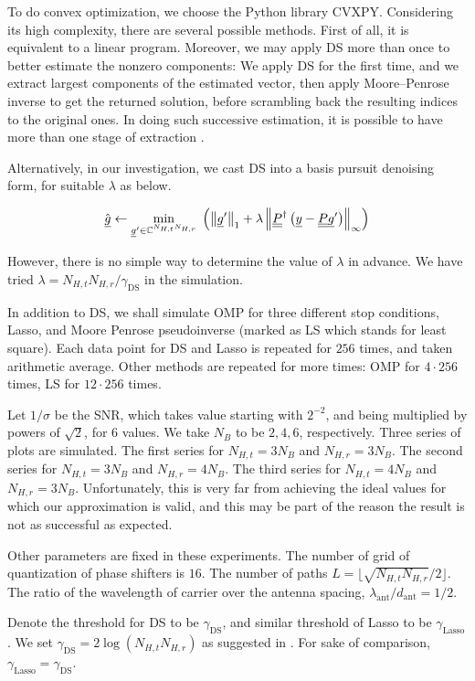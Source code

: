 \documentclass[journal]{IEEEtran}
\newcommand {\g} {\gamma}
\renewcommand {\l} {\lambda}
\newcommand {\s} {\sigma}
\newcommand {\D} {\cdot}
\newcommand {\Adj} {\dagger}
\newcommand {\m} [1] {\( #1 \)}
\newcommand {\V} [1] {\underline {#1}}
\newcommand {\M} [1] {\underline {\underline {#1}}}
\newcommand {\RB} [1] {\left( #1 \right)}
\newcommand {\VNm} [1] {\left \Vert #1 \right \Vert}
\newcommand {\R} [1] {\sqrt {#1}}
\newcommand {\Min} [1] {\underset {#1} {\mathrm {min}}\;}
\newcommand {\Disp} [1] {
   \begin {align*}
      #1
   \end {align*}
}
\begin{document}
To do convex optimization, we choose the Python library CVXPY.
Considering its high complexity, there are several possible methods.
First of all, it is equivalent to a linear program.
Moreover, we may apply DS more than once to better estimate the nonzero components:
We apply DS for the first time, and we extract largest components of the estimated vector, then apply Moore–Penrose inverse to get the returned solution, before scrambling back the resulting indices to the original ones.
In doing such successive estimation, it is possible to have more than one stage of extraction \cite {CaT07}.

Alternatively, in our investigation, we cast DS into a basis pursuit denoising form, for suitable \m {\l} \cite {BoV04} as below.
\Disp {
\Hat {\V {g}}
\leftarrow \Min {\V {g}' \in \mathbb {C} ^{N_{H,t} N_{H,r}}}
\RB {\VNm {\V {g}'} _1 + \l \VNm {\M {P}^\Adj \RB {\V {y} -\M {P} \V {g}'}} _\infty}
}
However, there is no simple way to determine the value of \m {\l} in advance.
We have tried \m {\l = N_{H,t} N_{H,r} / \g_{\mathrm {DS}}} in the simulation.

In addition to DS, we shall simulate OMP for three different stop conditions, Lasso, and Moore Penrose pseudoinverse (marked as LS which stands for least square).
Each data point for DS and Lasso is repeated for \m {256} times, and taken arithmetic average.
Other methods are repeated for more times: OMP for \m {4 \D 256} times, LS for \m {12 \D 256} times.

Let \m {1/\s} be the SNR, which takes value starting with \m {2^{-2}}, and being multiplied by powers of \m {\R {2}}, for \m {6} values.
We take \m {N_B} to be \m {2, 4, 6}, respectively.
Three series of plots are simulated.
The first series for \m {N_{H,t} = 3 N_B} and \m {N_{H,r} = 3 N_B}.
The second series for \m {N_{H,t} = 3 N_B} and \m {N_{H,r} = 4 N_B}.
The third series for \m {N_{H,t} = 4 N_B} and \m {N_{H,r} = 3 N_B}.
Unfortunately, this is very far from achieving the ideal values for which our approximation is valid, and this may be part of the reason the result is not as successful as expected.

Other parameters are fixed in these experiments.
The number of grid of quantization of phase shifters is \m {16}.
The number of paths \m {L = \lfloor \R {N_{H,t} N_{H,r}} / 2 \rfloor}.
The ratio of the wavelength of carrier over the antenna spacing, \m {\l _{\mathrm {ant}} / d _{\mathrm {ant}} = 1 / 2}.

Denote the threshold for DS to be \m {\g_{\mathrm {DS}}}, and similar threshold of Lasso to be \m {\g_{\mathrm {Lasso}}}.
We set \m {\g_{\mathrm {DS}} = 2 \log \RB {N_{H,t} N_{H,r}}} as suggested in \cite {CaT07}.
For sake of comparison, \m {\g_{\mathrm {Lasso}} = \g_{\mathrm {DS}}}.
\end{document}
